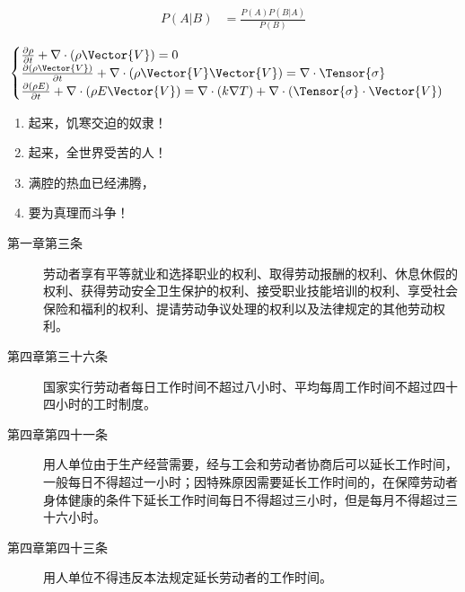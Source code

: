   
\begin{align}
    P(A|B) &= \frac{P(A)P(B|A)}{P(B)} \label{eq::bayesian}
    \end{align}

\begin{equation}
    \begin{cases}
        \frac{\partial \rho}{\partial t} + \nabla\cdot(\rho\Vector{V}) = 0 \\
        \frac{\partial (\rho\Vector{V})}{\partial t} + \nabla\cdot(\rho\Vector{V}\Vector{V}) = \nabla\cdot\Tensor{\sigma} \\
        \frac{\partial (\rho E)}{\partial t} + \nabla\cdot(\rho E\Vector{V}) = \nabla\cdot(k\nabla T) + \nabla\cdot(\Tensor{\sigma}\cdot\Vector{V})
    \end{cases}
    \end{equation}

\begin{enumerate}
    \item 起来，饥寒交迫的奴隶！
    \item 起来，全世界受苦的人！
    \item 满腔的热血已经沸腾，
    \item 要为真理而斗争！
  \end{enumerate}

\begin{description}
    \item[第一章第三条] 劳动者享有平等就业和选择职业的权利、取得劳动报酬的权利、休息休假的权利、获得劳动安全卫生保护的权利、接受职业技能培训的权利、享受社会保险和福利的权利、提请劳动争议处理的权利以及法律规定的其他劳动权利。
    \item[第四章第三十六条] 国家实行劳动者每日工作时间不超过八小时、平均每周工作时间不超过四十四小时的工时制度。
    \item[第四章第四十一条] 用人单位由于生产经营需要，经与工会和劳动者协商后可以延长工作时间，一般每日不得超过一小时；因特殊原因需要延长工作时间的，在保障劳动者身体健康的条件下延长工作时间每日不得超过三小时，但是每月不得超过三十六小时。
    \item[第四章第四十三条] 用人单位不得违反本法规定延长劳动者的工作时间。   
  \end{description}

